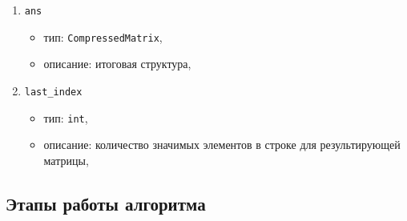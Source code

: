 \begin{enumerate}
	\item \texttt{ans}
	\begin{itemize}
		\item тип: \texttt{CompressedMatrix},
		\item описание: итоговая структура,
	\end{itemize}
	
	\item \texttt{last\_index}
	\begin{itemize}
		\item тип: \texttt{int},
		\item описание: количество значимых элементов в строке для результирующей матрицы,
	\end{itemize}
\end{enumerate}

\subsection*{Этапы работы алгоритма}
